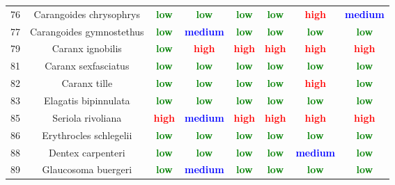 \documentclass{report}\usepackage[]{graphicx}\usepackage[]{color}
\begin{document}
\begin{table}[ht]
{\begin{tabular}{cccccccc}
   76 & Carangoides chrysophrys & \textcolor{green}{\textbf{low}} & \textcolor{green}{\textbf{low}} & \textcolor{green}{\textbf{low}} & \textcolor{green}{\textbf{low}} & \textcolor{red}{\textbf{high}} & \textcolor{blue}{\textbf{medium}} \\ 
   77 & Carangoides gymnostethus & \textcolor{green}{\textbf{low}} & \textcolor{blue}{\textbf{medium}} & \textcolor{green}{\textbf{low}} & \textcolor{green}{\textbf{low}} & \textcolor{green}{\textbf{low}} & \textcolor{green}{\textbf{low}} \\ 
   79 & Caranx ignobilis & \textcolor{green}{\textbf{low}} & \textcolor{red}{\textbf{high}} & \textcolor{red}{\textbf{high}} & \textcolor{red}{\textbf{high}} & \textcolor{red}{\textbf{high}} & \textcolor{red}{\textbf{high}} \\ 
   81 & Caranx sexfasciatus & \textcolor{green}{\textbf{low}} & \textcolor{green}{\textbf{low}} & \textcolor{green}{\textbf{low}} & \textcolor{green}{\textbf{low}} & \textcolor{green}{\textbf{low}} & \textcolor{green}{\textbf{low}} \\ 
   82 & Caranx tille & \textcolor{green}{\textbf{low}} & \textcolor{green}{\textbf{low}} & \textcolor{green}{\textbf{low}} & \textcolor{green}{\textbf{low}} & \textcolor{red}{\textbf{high}} & \textcolor{green}{\textbf{low}} \\ 
   83 & Elagatis bipinnulata & \textcolor{green}{\textbf{low}} & \textcolor{green}{\textbf{low}} & \textcolor{green}{\textbf{low}} & \textcolor{green}{\textbf{low}} & \textcolor{green}{\textbf{low}} & \textcolor{green}{\textbf{low}} \\ 
   85 & Seriola rivoliana & \textcolor{red}{\textbf{high}} & \textcolor{blue}{\textbf{medium}} & \textcolor{red}{\textbf{high}} & \textcolor{red}{\textbf{high}} & \textcolor{red}{\textbf{high}} & \textcolor{red}{\textbf{high}} \\ 
   86 & Erythrocles schlegelii & \textcolor{green}{\textbf{low}} & \textcolor{green}{\textbf{low}} & \textcolor{green}{\textbf{low}} & \textcolor{green}{\textbf{low}} & \textcolor{green}{\textbf{low}} & \textcolor{green}{\textbf{low}} \\ 
   88 & Dentex carpenteri & \textcolor{green}{\textbf{low}} & \textcolor{green}{\textbf{low}} & \textcolor{green}{\textbf{low}} & \textcolor{green}{\textbf{low}} & \textcolor{blue}{\textbf{medium}} & \textcolor{green}{\textbf{low}} \\ 
   89 & Glaucosoma buergeri & \textcolor{green}{\textbf{low}} & \textcolor{blue}{\textbf{medium}} & \textcolor{green}{\textbf{low}} & \textcolor{green}{\textbf{low}} & \textcolor{green}{\textbf{low}} & \textcolor{green}{\textbf{low}} \\ 

\end{tabular}}
\end{table}
\end{document}
